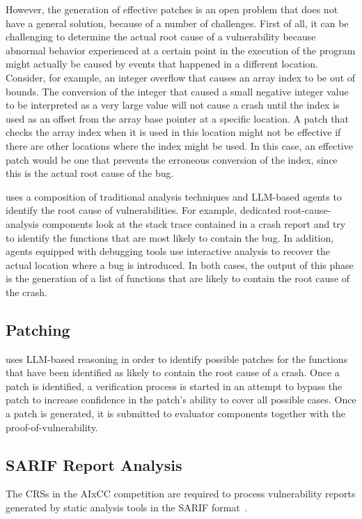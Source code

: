 However, the generation of effective patches is an open problem that does not have a general solution, because of a number of challenges.
First of all, it can be challenging to determine the actual root cause of a vulnerability because abnormal behavior experienced at a certain point in the execution of the program might actually be caused by events that happened in a different location.
Consider, for example, an integer overflow that causes an array index to be out of bounds.
The conversion of the integer that caused a small negative integer value to be interpreted as a very large value will not cause a crash until the index is used as an offset from the array base pointer at a specific location.
A patch that checks the array index when it is used in this location might not be effective if there are other locations where the index might be used.
In this case, an effective patch would be one that prevents the erroneous conversion of the index, since this is the actual root cause of the bug.

\artiphishell uses a composition of traditional analysis techniques and LLM-based agents to identify the root cause of vulnerabilities.
For example, dedicated root-cause-analysis components look at the stack trace contained in a crash report and try to identify the functions that are most likely to contain the bug.
In addition, agents equipped with debugging tools use interactive analysis to recover the actual location where a bug is introduced.
In both cases, the output of this phase is the generation of a list of functions that are likely to contain the root cause of the crash.

\subsection{Patching}

\artiphishell uses LLM-based reasoning in order to identify possible patches for the functions that have been identified as likely to contain the root cause of a crash.
Once a patch is identified, a verification process is started in an attempt to bypass the patch to increase confidence in the patch's ability to cover all possible cases.
Once a patch is generated, it is submitted to evaluator components together with the proof-of-vulnerability.

\subsection{SARIF Report Analysis}
The CRSs in the AIxCC competition are required to process vulnerability reports generated by static analysis tools in the SARIF format~\cite{sarif}.

